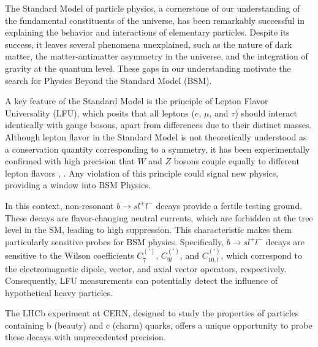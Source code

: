 The Standard Model of particle physics, a cornerstone of our 
understanding of the fundamental constituents of the universe, 
has been remarkably successful in explaining the behavior 
and interactions of elementary particles. Despite its success, 
it leaves several phenomena unexplained, such as the 
nature of dark matter, the matter-antimatter asymmetry in the 
universe, and the integration of gravity at the quantum level. 
These gaps in our understanding motivate the search for Physics 
Beyond the Standard Model (BSM).

A key feature of the Standard Model is the principle of Lepton 
Flavor Universality (LFU), which posits that all leptons ($e$, 
$\mu$, and $\tau$) should interact identically with gauge bosons, 
apart from differences due to their distinct masses. Although 
lepton flavor in the Standard Model is not theoretically understood 
as a conservation quantity corresponding to a symmetry, it has 
been experimentally confirmed with high precision that $W$ and $Z$ 
bosons couple equally to different lepton flavors \cite{LU_CDF}, 
\cite{LU_ATLAS}. Any violation of this principle could signal new 
physics, providing a window into BSM Physics.

In this context, non-resonant $b\to sl^+l^-$ decays provide a fertile 
testing ground. These decays are flavor-changing neutral currents, 
which are forbidden at the tree level in the SM, leading to high 
suppression. This characteristic makes them particularly sensitive 
probes for BSM physics. Specifically, $b\to sl^+l^-$ decays are 
sensitive to the Wilson coefficients $C_7^{\scriptscriptstyle (')}$, 
$C_{9l}^{\scriptscriptstyle (')}$, and $C_{10,l}^{\scriptscriptstyle (')}$, 
which correspond to the electromagnetic dipole, vector, and axial 
vector operators, respectively. %
Consequently, LFU measurements can potentially detect the influence 
of hypothetical heavy particles.

The LHCb experiment at CERN, designed to study the 
properties of particles containing b (beauty) and c (charm) quarks, offers 
a unique opportunity to probe these decays with unprecedented precision.
